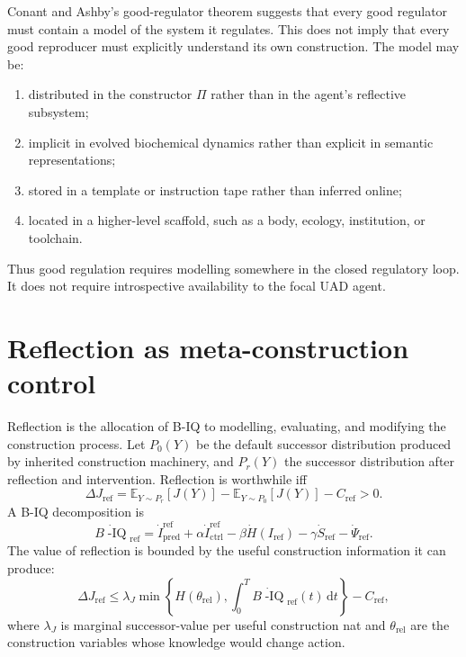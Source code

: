 \documentclass[11pt]{article}
\newcommand{\E}{\mathbb{E}}
\newcommand{\Biq}{B\!\operatorname{-IQ}}
\newcommand{\dd}{\mathrm{d}}
\begin{document}
Conant and Ashby's good-regulator theorem suggests that every good regulator must contain a model of the system it regulates. This does not imply that every good reproducer must explicitly understand its own construction. The model may be:
\begin{enumerate}[leftmargin=*]
  \item distributed in the constructor $\Pi$ rather than in the agent's reflective subsystem;
  \item implicit in evolved biochemical dynamics rather than explicit in semantic representations;
  \item stored in a template or instruction tape rather than inferred online;
  \item located in a higher-level scaffold, such as a body, ecology, institution, or toolchain.
\end{enumerate}
Thus good regulation requires modelling somewhere in the closed regulatory loop. It does not require introspective availability to the focal UAD agent.

\section{Reflection as meta-construction control}

Reflection is the allocation of B-IQ to modelling, evaluating, and modifying the construction process. Let $P_0(Y)$ be the default successor distribution produced by inherited construction machinery, and $P_r(Y)$ the successor distribution after reflection and intervention. Reflection is worthwhile iff
\begin{equation}
  \Delta J_{\mathrm{ref}}
  =\E_{Y\sim P_r}[J(Y)]-\E_{Y\sim P_0}[J(Y)]-C_{\mathrm{ref}}>0.
\end{equation}
A B-IQ decomposition is
\begin{equation}
  \dot{\Biq}_{\mathrm{ref}}
  =\dot I_{\mathrm{pred}}^{\mathrm{ref}}
  +\alpha \dot I_{\mathrm{ctrl}}^{\mathrm{ref}}
  -\beta \dot H(I_{\mathrm{ref}})
  -\gamma \dot S_{\mathrm{ref}}
  -\dot\Psi_{\mathrm{ref}}.
\end{equation}
The value of reflection is bounded by the useful construction information it can produce:
\begin{equation}
  \Delta J_{\mathrm{ref}}
  \le
  \lambda_J\min\left\{H(\theta_{\mathrm{rel}}),\int_0^T\dot{\Biq}_{\mathrm{ref}}(t)\,\dd t\right\}-C_{\mathrm{ref}},
\end{equation}
where $\lambda_J$ is marginal successor-value per useful construction nat and $\theta_{\mathrm{rel}}$ are the construction variables whose knowledge would change action.
\end{document}
